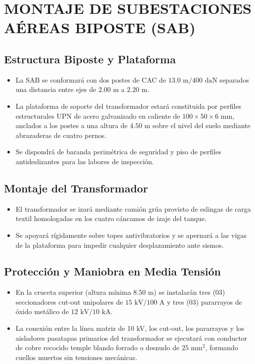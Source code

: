 \section{MONTAJE DE SUBESTACIONES AÉREAS BIPOSTE (SAB)}

\subsection{Estructura Biposte y Plataforma}
\begin{itemize}
  \item La SAB se conformará con dos postes de CAC de $13.0\text{ m} / 400\text{ daN}$ separados una distancia entre ejes de $2.00\text{ m}$ a $2.20\text{ m}$.
  \item La plataforma de soporte del transformador estará constituida por perfiles estructurales UPN de acero galvanizado en caliente de $100 \times 50 \times 6\text{ mm}$, anclados a los postes a una altura de $4.50\text{ m}$ sobre el nivel del suelo mediante abrazaderas de cuatro pernos.
  \item Se dispondrá de baranda perimétrica de seguridad y piso de perfiles antideslizantes para las labores de inspección.
\end{itemize}

\subsection{Montaje del Transformador}
\begin{itemize}
  \item El transformador se izará mediante camión grúa provisto de eslingas de carga textil homologadas en los cuatro cáncamos de izaje del tanque.
  \item Se apoyará rígidamente sobre topes antivibratorios y se apernará a las vigas de la plataforma para impedir cualquier desplazamiento ante sismos.
\end{itemize}

\subsection{Protección y Maniobra en Media Tensión}
\begin{itemize}
  \item En la cruceta superior (altura mínima $8.50\text{ m}$) se instalarán tres (03) seccionadores cut-out unipolares de $15\text{ kV} / 100\text{ A}$ y tres (03) pararrayos de óxido metálico de $12\text{ kV} / 10\text{ kA}$.
  \item La conexión entre la línea matriz de 10 kV, los cut-out, los pararrayos y los aisladores pasatapas primarios del transformador se ejecutará con conductor de cobre recocido temple blando forrado o desnudo de $25\text{ mm}^2$, formando cuellos muertos sin tensiones mecánicas.
\end{itemize}

